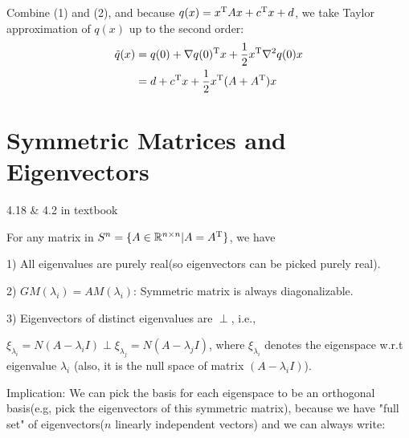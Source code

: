 \begin{example}
Combine (1) and (2), and because $q(x) = x^{{\rm T}}Ax + c^{{\rm T}}x + d$, we take Taylor approximation of $q(x)$ up to the second order:
\begin{align*}
\tilde{q}(x) &= q(0) + \nabla q(0)^{{\rm T}}x + \frac{1}{2}x^{{\rm T}}\nabla^2q(0)x\\
&= d + c^{{\rm T}}x + \frac{1}{2}x^{{\rm T}}(A + A^{{\rm T}})x
\end{align*}

\end{example}


\section{Symmetric Matrices and Eigenvectors}

\begin{theorem}{4.18 \& 4.2 in textbook}
	
	For any matrix in $S^n = \{A\in \mathbb{R}^{n\times n} | A = A^{{\rm T}} \}$, we have
	
	1) All eigenvalues are purely real(so eigenvectors can be picked purely real).
	
	2) $GM(\lambda_i) = AM(\lambda_i)$: Symmetric matrix is always diagonalizable.
	
	3) Eigenvectors of distinct eigenvalues are $\perp$, i.e.,
	
\qquad $\xi_{\lambda_i} = N(A - \lambda_iI)\perp \xi_{\lambda_j} = N(A - \lambda_jI)$, where $\xi_{\lambda_i}$ denotes the eigenspace w.r.t eigenvalue $\lambda_i$ (also, it is the null space of matrix $(A - \lambda_iI)$).
\end{theorem}

Implication: We can pick the basis for each eigenspace to be an orthogonal basis(e.g, pick the eigenvectors of this symmetric matrix), because we have "full set" of eigenvectors($n$ linearly independent vectors) and we can always write:\\


